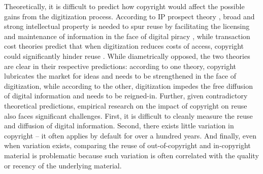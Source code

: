 \documentclass[11pt]{article}
\begin{document}
Theoretically, it is difficult to predict how copyright would affect the possible gains from the digitization process. According to IP prospect theory \citep{kitch_nature_1977}, broad and strong intellectual property is needed to spur reuse by facilitating the licensing and maintenance of information \citep{mazzoleni_economic_1998, gallini_intellectual_2002} in the face of digital piracy \citep{rob_piracy_2007}, while transaction cost theories predict that when digitization reduces costs of access, copyright could significantly hinder reuse \citep{lessig_free_2005, benkler_wealth_2006, zittrain_future_2009, lemley_ex_2004}. While diametrically opposed, the two theories are clear in their respective predictions: according  to  one  theory, copyright lubricates  the  market for ideas \citep{gans_product_2003} and needs to be strengthened in the face of digitization, while according to the other, digitization impedes the free diffusion of digital information and needs to be reigned-in. Further, given contradictory theoretical predictions, empirical research on the impact of copyright on reuse also faces significant challenges. First, it is difficult to cleanly measure the reuse and diffusion of digital information. Second, there exists little variation in copyright -- it often applies by default for over a hundred years. And finally, even when variation exists, comparing the reuse of out-of-copyright and in-copyright material is problematic because such variation is often correlated with the quality or recency of the underlying material. 


\end{document}
